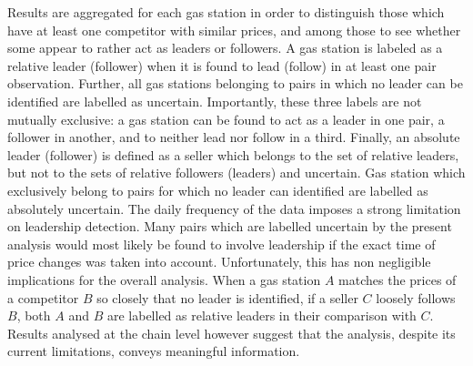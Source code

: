 \documentclass[english]{article}
\begin{document}
Results are aggregated for each gas station in order to distinguish those which have at least one competitor with similar prices, and among those to see whether some appear to rather act as leaders or followers. A gas station is labeled as a relative leader (follower) when it is found to lead (follow) in at least one pair observation. Further, all gas stations belonging to pairs in which no leader can be identified are labelled as uncertain. Importantly, these three labels are not mutually exclusive: a gas station can be found to act as a leader in one pair, a follower in another, and to neither lead nor follow in a third. Finally, an absolute leader (follower) is defined as a seller which belongs to the set of relative leaders, but not to the sets of relative followers (leaders) and uncertain. Gas station which exclusively belong to pairs for which no leader can identified are labelled as absolutely uncertain. The daily frequency of the data imposes a strong limitation on leadership detection. Many pairs which are labelled uncertain by the present analysis would most likely be found to involve leadership if the exact time of price changes was taken into account. Unfortunately, this has non negligible implications for the overall analysis. When a gas station $A$ matches the prices of a competitor $B$ so closely that no leader is identified, if a seller $C$ loosely follows $B$, both $A$ and $B$ are labelled as relative leaders in their comparison with $C$. Results analysed at the chain level however suggest that the analysis, despite its current limitations, conveys meaningful information.
\end{document}
